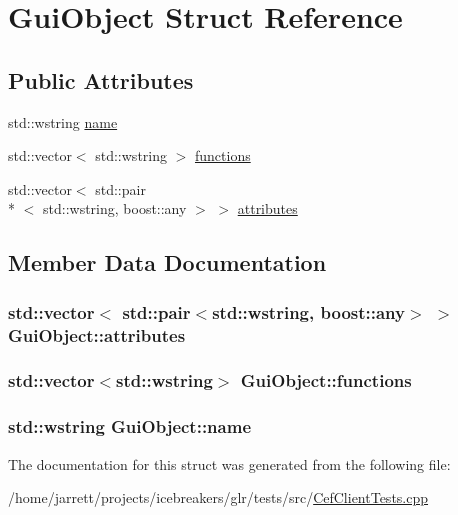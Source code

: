 \hypertarget{structGuiObject}{\section{Gui\-Object Struct Reference}
\label{structGuiObject}
}
\subsection*{Public Attributes}
\begin{DoxyCompactItemize}
\item 
std\-::wstring \hyperlink{structGuiObject_af4e916e086b038fa6a3e6329fff4bc0d}{name}
\item 
std\-::vector$<$ std\-::wstring $>$ \hyperlink{structGuiObject_a3f164f51c385a8b2309ebc6b44c315ca}{functions}
\item 
std\-::vector$<$ std\-::pair\\*
$<$ std\-::wstring, boost\-::any $>$ $>$ \hyperlink{structGuiObject_ac1980a9be9d689d0b78c1449dd52b9ae}{attributes}
\end{DoxyCompactItemize}


\subsection{Member Data Documentation}
\hypertarget{structGuiObject_ac1980a9be9d689d0b78c1449dd52b9ae}{
\subsubsection[{attributes}]{\setlength{\rightskip}{0pt plus 5cm}std\-::vector$<$ std\-::pair$<$std\-::wstring, boost\-::any$>$ $>$ Gui\-Object\-::attributes}}\label{structGuiObject_ac1980a9be9d689d0b78c1449dd52b9ae}
\hypertarget{structGuiObject_a3f164f51c385a8b2309ebc6b44c315ca}{
\subsubsection[{functions}]{\setlength{\rightskip}{0pt plus 5cm}std\-::vector$<$std\-::wstring$>$ Gui\-Object\-::functions}}\label{structGuiObject_a3f164f51c385a8b2309ebc6b44c315ca}
\hypertarget{structGuiObject_af4e916e086b038fa6a3e6329fff4bc0d}{
\subsubsection[{name}]{\setlength{\rightskip}{0pt plus 5cm}std\-::wstring Gui\-Object\-::name}}\label{structGuiObject_af4e916e086b038fa6a3e6329fff4bc0d}


The documentation for this struct was generated from the following file\-:\begin{DoxyCompactItemize}
\item 
/home/jarrett/projects/icebreakers/glr/tests/src/\hyperlink{CefClientTests_8cpp}{Cef\-Client\-Tests.\-cpp}\end{DoxyCompactItemize}
